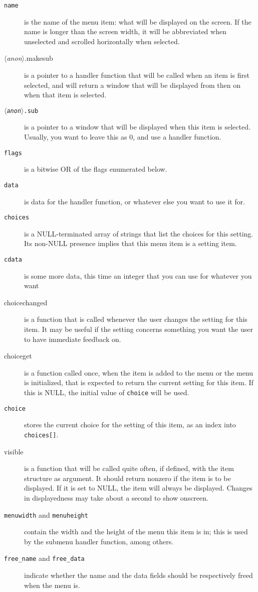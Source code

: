 \documentclass[12pt,letterpaper]{report}
\let\ttt\tt
\def\tt{\def\_{{\ttt\char`\_}}\ttt}
\def\<#1>{\leavevmode\hbox{$\langle${\sl#1\/}$\rangle$}}
\begin{document}
\begin{description}
\item[{\tt name}] is the name of the menu item: what will be displayed on the screen. If the name is
longer than the screen width, it will be abbreviated when unselected and scrolled horizontally when selected.
\item[{\sf \<anon>.makesub}] is a pointer to a handler function that will be called when an item is first selected,
and will return a window that will be displayed from then on when that item is selected.
\item[{\tt \<anon>.sub}] is a pointer to a window that will be displayed when this item is selected. Usually,
you want to leave this as 0, and use a handler function.
\item[{\tt flags}] is a bitwise OR of the flags enumerated below.
\item[{\tt data}] is data for the handler function, or whatever else you want to use it for.
\item[{\tt choices}] is a NULL-terminated array of strings that list the choices for this setting.
Its non-NULL presence implies that this menu item is a setting item.
\item[{\tt cdata}] is some more data, this time an integer that you can use for whatever you want
\item[{\sf choicechanged}] is a function that is called whenever the user changes the setting for this item.
It may be useful if the setting concerns something you want the user to have immediate feedback on.
\item[{\sf choiceget}] is a function called once, when the item is added to the menu or the menu is
initialized, that is expected to return the current setting for this item. If this is NULL, the initial value
of {\tt choice} will be used.
\item[{\tt choice}] stores the current choice for the setting of this item, as an index into {\tt choices[]}.
\item[{\sf visible}] is a function that will be called quite often, if defined, with the item structure
as argument. It should return nonzero if the item is to be displayed. If it is set to NULL, the item
will always be displayed. Changes in displayedness may take about a second to show onscreen.
\item[{\tt menuwidth} and {\tt menuheight}] contain the width and the height of the menu this item is in;
this is used by the submenu handler function, among others.
\item[{\tt free_name} and {\tt free_data}] indicate whether the name and the data fields should be respectively
freed when the menu is.
\end{description}
\end{document}
